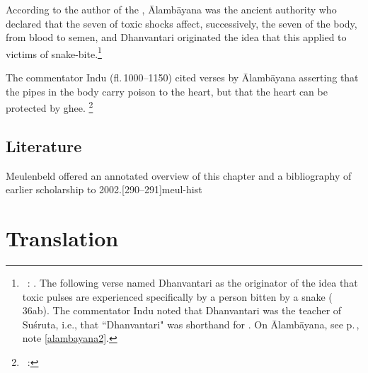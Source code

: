 According to the author of the \AS, Ālambāyana\label{alambayana1} was
the ancient authority who declared that the seven 
of toxic shocks affect, successively, the seven
 of the body, from blood to semen, and
Dhanvantari originated the idea that this applied to victims of
snake-bite.\footnote{\AS\ : .  The following verse named
    Dhanvantari as the originator of the idea that toxic pulses are
    experienced specifically by a person bitten by a snake 
    ( 36ab).  The
    commentator Indu noted that Dhanvantari was the teacher of Suśruta, i.e., 
    that “Dhanvantari" was shorthand for \SS.    
    On Ālambāyana, see p.\,\pageref{alambayana2}, note \ref{alambayana2}.}
    
The commentator Indu (fl.\,1000--1150) cited verses by Ālambāyana
asserting that the pipes in the body carry poison to the heart, but
that the heart can be protected by ghee. \footnote{\AS\ :
    }


\subsection{Literature}

Meulenbeld offered an annotated overview of this chapter and a bibliography
of earlier scholarship to 2002.[290--291]{meul-hist} 

\newpage

\section{Translation}


